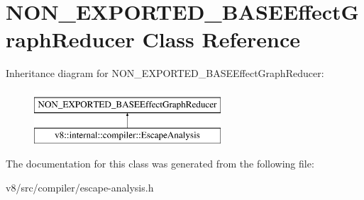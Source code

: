 \hypertarget{classNON__EXPORTED__BASEEffectGraphReducer}{}\section{N\+O\+N\+\_\+\+E\+X\+P\+O\+R\+T\+E\+D\+\_\+\+B\+A\+S\+E\+Effect\+Graph\+Reducer Class Reference}
\label{classNON__EXPORTED__BASEEffectGraphReducer}
Inheritance diagram for N\+O\+N\+\_\+\+E\+X\+P\+O\+R\+T\+E\+D\+\_\+\+B\+A\+S\+E\+Effect\+Graph\+Reducer\+:\begin{figure}[H]
\begin{center}
\leavevmode
\includegraphics[height=2.000000cm]{classNON__EXPORTED__BASEEffectGraphReducer}
\end{center}
\end{figure}


The documentation for this class was generated from the following file\+:\begin{DoxyCompactItemize}
\item 
v8/src/compiler/escape-\/analysis.\+h\end{DoxyCompactItemize}
